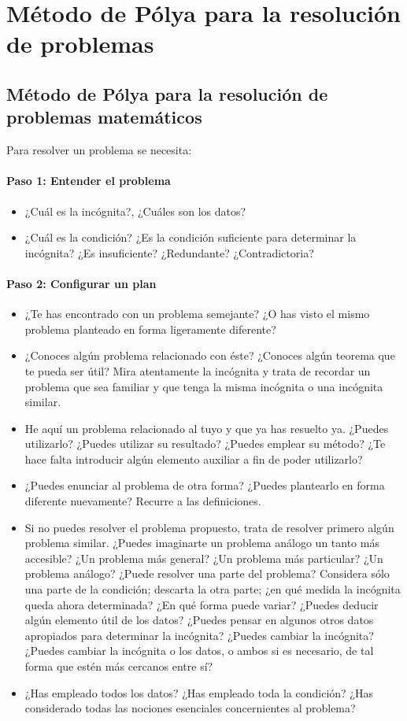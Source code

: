 \chapter{Método de Pólya para la resolución de problemas}

\section{Método de Pólya para la resolución de problemas matemáticos}

\noindent Para resolver un problema se necesita:
\subsubsection*{Paso 1: Entender el problema}
\begin{itemize}
\item ¿Cuál es la incógnita?, ¿Cuáles son los datos?
\item ¿Cuál es la condición? ¿Es la condición suficiente para determinar la
  incógnita? ¿Es insuficiente? ¿Redundante? ¿Contradictoria?
\end{itemize}

\subsubsection*{Paso 2: Configurar un plan}
\begin{itemize}
\item ¿Te has encontrado con un problema semejante? ¿O has visto el mismo
  problema planteado en forma ligeramente diferente?
\item ¿Conoces algún problema relacionado con éste? ¿Conoces algún teorema que
  te pueda ser útil? Mira atentamente la incógnita y trata de recordar un
  problema que sea familiar y que tenga la misma incógnita o una incógnita
  similar.
\item He aquí un problema relacionado al tuyo y que ya has resuelto ya. ¿Puedes
  utilizarlo? ¿Puedes utilizar su resultado? ¿Puedes emplear su método? ¿Te
  hace falta introducir algún elemento auxiliar a fin de poder utilizarlo?
\item ¿Puedes enunciar al problema de otra forma? ¿Puedes plantearlo en forma
  diferente nuevamente? Recurre a las definiciones.
\item Si no puedes resolver el problema propuesto, trata de resolver primero
  algún problema similar. ¿Puedes imaginarte un problema análogo un tanto más
  accesible? ¿Un problema más general? ¿Un problema más particular? ¿Un problema
  análogo? ¿Puede resolver una parte del problema? Considera sólo una parte de
  la condición; descarta la otra parte; ¿en qué medida la incógnita queda ahora
  determinada? ¿En qué forma puede variar? ¿Puedes deducir algún
  elemento útil de los datos? ¿Puedes pensar en algunos otros datos apropiados
  para determinar la incógnita? ¿Puedes cambiar la incógnita? ¿Puedes cambiar la
  incógnita o los datos, o ambos si es necesario, de tal forma que estén más
  cercanos entre sí?
\item ¿Has empleado todos los datos? ¿Has empleado toda la condición? ¿Has
  considerado todas las nociones esenciales concernientes al problema?
\end{itemize}


